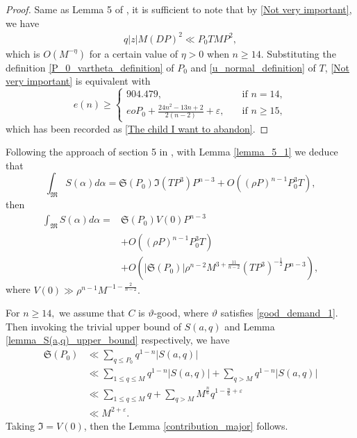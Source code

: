 \documentclass[12pt]{amsart}
\theoremstyle{definition}
\numberwithin{equation}{section}
\begin{document}
\begin{proof}
Same as Lemma 5 of \cite{browning2009least}, it is sufficient to note that by \eqref{Not very important}, we have
    \begin{equation*}
        \begin{split}
            q|z|M(DP)^2 \ll P_0 T M P^2 ,
        \end{split}
    \end{equation*}
    which is $O(M^{-\eta})$ for a certain value of $\eta >0$ when $n \geq 14.$
    Substituting the definition \eqref{P_0_vartheta_definition} of $P_0$ and \eqref{u_normal_definition} of $T$, \eqref{Not very important} is equivalent with
    $$
    e(n) \geq
    \begin{cases}
    904.479, \quad &\text{if } n =14,\\
    eoP_0+\frac{24n^2-13n+2}{2(n-2)}+\varepsilon, \quad &\text{if }n\geq 15,
    \end{cases}
    $$
    which has been recorded as \eqref{The child I want to abandon}.
\end{proof}

Following the approach of section 5 in \cite{browning2009least}, with Lemma \ref{lemma_5_1} we deduce that
\begin{equation*}
        \int_{\mathfrak{M}} S(\alpha) d\alpha=
        \mathfrak{S}(P_0)\mathfrak{I}(TP^3)P^{n-3}
        +O\left((\rho P)^{n-1}P_0^{3}T\right),
\end{equation*}
then
\begin{equation}
    \begin{split}
        \int_{\mathfrak{M}} S(\alpha) d\alpha=
        &\mathfrak{S}(P_0)V(0)P^{n-3}\\
        &+O\left((\rho P)^{n-1}P_0^{3}T\right)\\
        &+O\left(|\mathfrak{S}(P_0)|\rho ^{n-2}M^{3+\frac{11}{n-2}}(TP^3)^{-\frac{1}{2}}P^{n-3}\right),
    \end{split}
\end{equation}
where $V(0) \gg \rho^{n-1}M^{-1-\frac{2}{n-2}}.$


For $n \geq 14,$ we assume that $C$ is $\vartheta$-good, where $\vartheta$ satisfies \eqref{good_demand_1}. Then invoking the trivial upper bound of $S(a,q)$ and Lemma \ref{lemma_S(a,q)_upper_bound} respectively, we have
\begin{equation*}
    \begin{split}
        \mathfrak{S}(P_0) 
        &\ll \sum_{q \leq P_0} q^{1-n}|S(a,q)|\\ 
        &\ll \sum_{1 \leq q \leq M} q^{1-n}|S(a,q)|+\sum_{q >M} q^{1-n}|S(a,q)|\\
        &\ll \sum_{1 \leq q \leq M} q+\sum_{q >M}M^{\frac{n}{6}}q^{1-\frac{n}{6}+\varepsilon}\\
        &\ll M^{2+\varepsilon}.
    \end{split}
\end{equation*}
Taking $\mathfrak{I}=V(0)$, then the Lemma \ref{contribution_major} follows.
\end{document}
